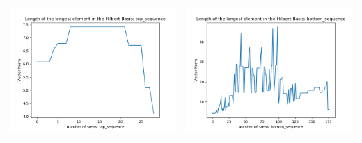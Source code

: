 \documentclass[10pt]{article}
\begin{document}
\begin{tabular}{c|c}
\begin{minipage}{.4\textwidth}
\includegraphics[width=\textwidth]{"DATA/5d/5 generators 2 bound C/top_sequence LENGTH"}
\end{minipage} &
\begin{minipage}{.4\textwidth}
\includegraphics[width=\textwidth]{"DATA/5d/5 generators 2 bound C bottomup/bottom_sequence LENGTH"}
\end{minipage}
\end{tabular}
\end{document}
